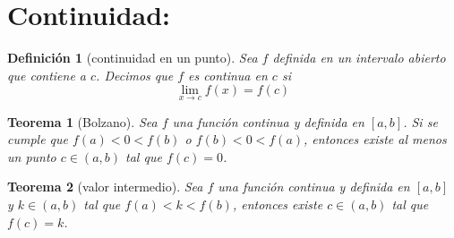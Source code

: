 \documentclass{article}
\newtheorem*{theorem}{Teorema}
\newtheorem*{definition}{Definición}
\begin{document}
  \section*{Continuidad:}
  \begin{definition}[continuidad en un punto]
      Sea $f$ definida en un intervalo abierto que contiene a $c$. Decimos que $f$ es 
      continua en $c$ si
      \[
        \lim_{x\to c}f(x)=f(c)
      \]
    \end{definition}
    \begin{theorem}[Bolzano]
      Sea $f$ una función continua y definida en $[a,b]$. Si se cumple que $f(a)<0<f(b)$ o 
      $f(b)<0<f(a)$, entonces existe al menos un punto $c\in(a,b)$ tal que $f(c)=0$.
    \end{theorem}
    \begin{theorem}[valor intermedio]
      Sea $f$ una función continua y definida en $[a,b]$ y $k\in(a,b)$ tal que $f(a)<k<f(b)$,
      entonces existe $c\in(a,b)$ tal que $f(c)=k$.
    \end{theorem}
    
    
    
\end{document}
